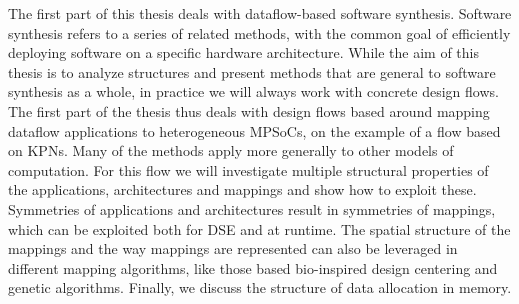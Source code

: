 The first part of this thesis deals with dataflow-based software synthesis.
Software synthesis refers to a series of related methods, with the common goal of efficiently deploying software on a specific hardware architecture.
While the aim of this thesis is to analyze structures and present methods that are general to software synthesis as a whole, in practice we will always work with concrete design flows.
The first part of the thesis thus deals with design flows based around mapping dataflow applications to heterogeneous \acp{MPSoC}, on the example of a flow based on \acp{KPN}.
Many of the methods apply more generally to other models of computation.
For this flow we will investigate multiple structural properties of the applications, architectures and mappings and show how to exploit these.
Symmetries of applications and architectures result in symmetries of mappings, which can be exploited both for \ac{DSE} and at runtime.
The spatial structure of the mappings and the way mappings are represented can also be leveraged in different mapping algorithms, like those based bio-inspired design centering and genetic algorithms.
Finally, we discuss the structure of data allocation in memory.